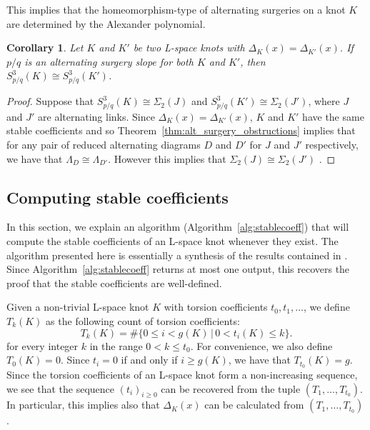\documentclass{amsart} %
\theoremstyle{thm}
\newtheorem{cor}[Theorem]{Corollary}
\theoremstyle{definition}
\numberwithin{equation}{section}
\begin{document}
This implies that the homeomorphism-type of alternating surgeries on a knot $K$ are determined by the Alexander polynomial.
\begin{cor}\label{cor:Alexpolydetermines}
Let $K$ and $K'$ be two L-space knots with $\Delta_K(x)=\Delta_{K'}(x)$. If $p/q$ is an alternating surgery slope for both $K$ and $K'$, then $S_{p/q}^3(K)\cong S_{p/q}^3(K')$.
\end{cor}
\begin{proof}
Suppose that $S_{p/q}^3(K)\cong \Sigma_2(J)$ and $S_{p/q}^3(K')\cong \Sigma_2(J')$, where $J$ and $J'$ are alternating links. Since $\Delta_K(x)=\Delta_{K'}(x)$, $K$ and $K'$ have the same stable coefficients and so Theorem~\ref{thm:alt_surgery_obstructions} implies that for any pair of reduced alternating diagrams $D$ and $D'$ for $J$ and $J'$ respectively, we have that $\Lambda_D\cong \Lambda_{D'}$. However this implies that $\Sigma_2(J)\cong \Sigma_2(J')$ \cite{Gr13}.
\end{proof}


\subsection{Computing stable coefficients}
In this section, we explain an algorithm (Algorithm~\ref{alg:stablecoeff}) that will compute the stable coefficients of an L-space knot whenever they exist.
The algorithm presented here is essentially a synthesis of the results contained in \cite[\S2]{Mc17}.  
Since Algorithm~\ref{alg:stablecoeff} returns at most one output, this recovers the proof that the stable coefficients are well-defined.

Given a non-trivial L-space knot $K$ with torsion coefficients $t_0, t_1,\dots $, we define $T_k(K)$ as the following count of torsion coefficients:
\[
T_k(K) = \# \{0\leq i <g(K) \, |\, 0<t_i(K) \leq k \}.
\]
for every integer $k$ in the range $0< k\leq t_0$. For convenience, we also define $T_0(K)=0$. Since $t_i=0$ if and only if $i\geq g(K)$, we have that $T_{t_0}(K)=g$.
Since the torsion coefficients of an L-space knot form a non-increasing sequence, we see that the sequence $(t_i)_{i\geq 0}$ can be recovered from the tuple $(T_1, \dots , T_{t_0})$. In particular, this implies also that $\Delta_K(x)$ can be calculated from $(T_1, \dots , T_{t_0})$.
\end{document}
